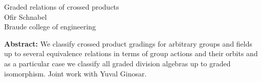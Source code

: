 \documentclass[12pt,a4paper]{article}
\begin{document}
\thispagestyle{empty} 
\begin{center}
{\large  Graded relations of crossed products}\\
\vspace*{.5cm}
Ofir Schnabel\\
Braude college of engineering\\
\end{center}
\vspace*{.8cm}

{\bf Abstract:}  We classify crossed product gradings for arbitrary groups and fields up to several equivalence relations in terms of group actions and their orbits and as a particular case we classify all graded division algebras up to graded isomorphism. Joint work with Yuval Ginosar.
\end{document}
